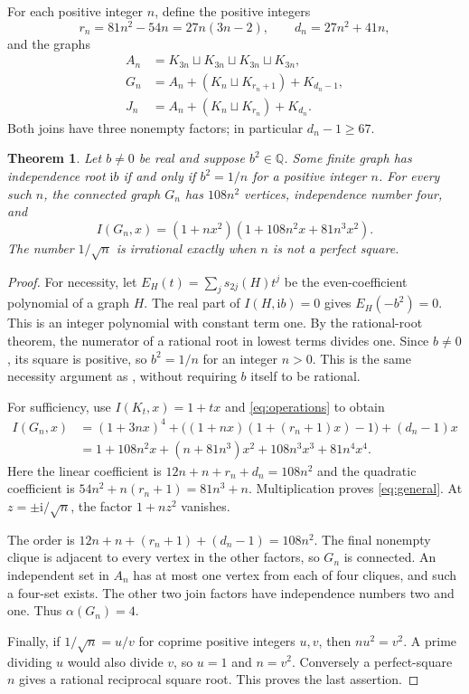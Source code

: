 \documentclass[11pt]{article}
\newtheorem{theorem}{Theorem}
\newcommand{\ii}{\mathrm{i}}
\begin{document}
For each positive integer $n$, define the positive integers
\[
 r_n=81n^2-54n=27n(3n-2),\qquad d_n=27n^2+41n,
\]
and the graphs
\begin{align*}
 A_n&=K_{3n}\sqcup K_{3n}\sqcup K_{3n}\sqcup K_{3n},\\
 G_n&=A_n+(K_n\sqcup K_{r_n+1})+K_{d_n-1},\\
 J_n&=A_n+(K_n\sqcup K_{r_n})+K_{d_n}.
\end{align*}
Both joins have three nonempty factors; in particular $d_n-1\geq67$.

\begin{theorem}\label{thm:classification}
Let $b\neq0$ be real and suppose $b^2\in\mathbb Q$. Some finite graph
has independence root $\ii b$ if and only if $b^2=1/n$ for a positive
integer $n$. For every such $n$, the connected graph $G_n$ has
$108n^2$ vertices, independence number four, and
\begin{equation}\label{eq:general}
 I(G_n,x)=(1+nx^2)(1+108n^2x+81n^3x^2).
\end{equation}
The number $1/\sqrt n$ is irrational exactly when $n$ is not a perfect square.
\end{theorem}
\begin{proof}
For necessity, let
$E_H(t)=\sum_j s_{2j}(H)t^j$ be the even-coefficient polynomial of a
graph $H$. The real part of $I(H,\ii b)=0$ gives $E_H(-b^2)=0$.
This is an integer polynomial with constant term one. By the rational-root
theorem, the numerator of a rational root in lowest terms divides one.
Since $b\neq0$, its square is positive, so $b^2=1/n$ for an integer $n>0$.
This is the same necessity argument as \cite[Proposition 2.9]{BC}, without
requiring $b$ itself to be rational.

For sufficiency, use $I(K_t,x)=1+tx$ and \eqref{eq:operations} to obtain
\begin{align*}
 I(G_n,x)&=(1+3nx)^4+
       \bigl((1+nx)(1+(r_n+1)x)-1\bigr)+(d_n-1)x\\
 &=1+108n^2x+(n+81n^3)x^2+108n^3x^3+81n^4x^4.
\end{align*}
Here the linear coefficient is
$12n+n+r_n+d_n=108n^2$ and the quadratic coefficient is
$54n^2+n(r_n+1)=81n^3+n$. Multiplication proves
\eqref{eq:general}. At $z=\pm\ii/\sqrt n$, the factor $1+nz^2$ vanishes.

The order is $12n+n+(r_n+1)+(d_n-1)=108n^2$.
The final nonempty clique is adjacent to every vertex in the other
factors, so $G_n$ is connected. An independent set in $A_n$ has at most
one vertex from each of four cliques, and such a four-set exists.
The other two join factors have independence numbers two and one.
Thus $\alpha(G_n)=4$.

Finally, if $1/\sqrt n=u/v$ for coprime positive integers $u,v$, then
$nu^2=v^2$. A prime dividing $u$ would also divide $v$, so $u=1$ and
$n=v^2$. Conversely a perfect-square $n$ gives a rational reciprocal
square root. This proves the last assertion.
\end{proof}
\end{document}

